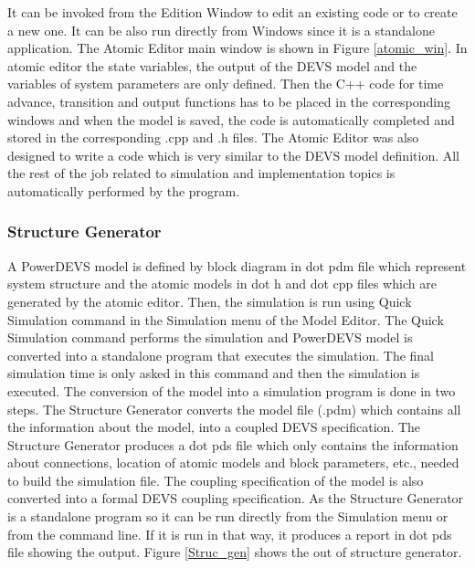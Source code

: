 \documentclass[titlepage]{article}%
\begin{document}
It can be invoked from the Edition Window to edit an existing code or to create a new one. It can be also run directly from Windows since it is a standalone application. The Atomic Editor main window is shown in Figure \ref{atomic_win}. In atomic editor the state variables, the output of the DEVS model and the variables of system parameters are only defined. Then the C++ code for time advance, transition and output functions has to be placed in the corresponding windows and when the model is saved, the code is automatically completed and stored in the corresponding .cpp and .h files. The Atomic Editor was also designed to write a code which is very similar to the DEVS model definition. All the rest of the job related to simulation and implementation topics is automatically performed by the program.
\subsubsection{Structure Generator}
A PowerDEVS model is defined by block diagram in dot pdm file which represent system structure and the atomic models in dot h and dot cpp files which are generated by the atomic editor. Then, the simulation is run using Quick Simulation command in the Simulation menu of the Model Editor. The Quick Simulation command performs the simulation and PowerDEVS model is converted into a standalone program that executes the simulation. The final simulation time is only asked in this command and then the simulation is executed.
The conversion of the model into a simulation program is done in two steps. The Structure Generator converts the model file (.pdm) which contains all the information about the model, into a coupled DEVS specification. The Structure Generator produces a dot pds file which only contains the information about connections, location of atomic models and block parameters, etc., needed to build the simulation file. The coupling specification of the model is also converted into a formal DEVS coupling specification. As the Structure Generator is a standalone program so it can be run directly from the Simulation menu or from the command line. If it is run in that way, it produces a report in dot pds file showing the output. Figure \ref{Struc_gen} shows the out of structure generator.
\end{document}

